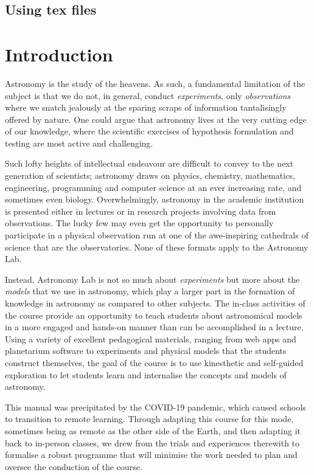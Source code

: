 \documentclass[12pt]{article}
\begin{document}
\subsection{Using tex files}


\section{Introduction}

Astronomy is the study of the heavens. As such, a fundamental limitation of the subject is that we do not, in general, conduct \emph{experiments}, only \emph{observations} where we snatch jealously at the sparing scraps of information tantalisingly offered by nature. One could argue that astronomy lives at the very cutting edge of our knowledge, where the scientific exercises of hypothesis formulation and testing are most active and challenging.

Such lofty heights of intellectual endeavour are difficult to convey to the next generation of scientists; astronomy draws on physics, chemistry, mathematics, engineering, programming and computer science at an ever increasing rate, and sometimes even biology. Overwhelmingly, astronomy in the academic institution is presented either in lectures or in research projects involving data from observations. The lucky few may even get the opportunity to personally participate in a physical observation run at one of the awe-inspiring cathedrals of science that are the observatories. None of these formats apply to the Astronomy Lab.

Instead, Astronomy Lab is not so much about \emph{experiments} but more about the \emph{models} that we use in astronomy, which play a larger part in the formation of knowledge in astronomy as compared to other subjects. The in-class activities of the course provide an opportunity to teach students about astronomical models in a more engaged and hands-on manner than can be accomplished in a lecture. Using a variety of excellent pedagogical materials, ranging from web apps and planetarium software to experiments and physical models that the students construct themselves, the goal of the course is to use kinesthetic and self-guided exploration to let students learn and internalise the concepts and models of astronomy.

This manual was precipitated by the COVID-19 pandemic, which caused schools to transition to remote learning. Through adapting this course for this mode, sometimes being as remote as the other side of the Earth, and then adapting it back to in-person classes, we drew from the trials and experiences therewith to formalise a robust programme that will minimise the work needed to plan and oversee the conduction of the course.
\end{document}
